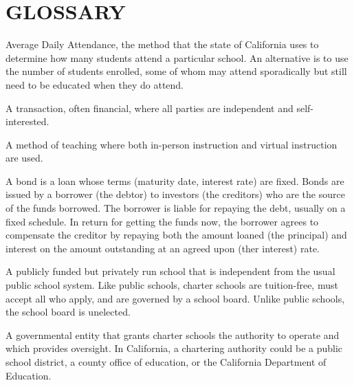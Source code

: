
\chapter[Glossary]{\centering\normalfont\normalzise GLOSSARY}\label{ch:glossary}

\begin{description}[nosep]\DoubleSpacing%

  \medskip\item[ADA] Average Daily Attendance, the method that the state of California uses to determine how many students attend a particular school. An alternative is to use the number of students enrolled, some of whom may attend sporadically but still need to be educated when they do attend. \parencite{SACS2019}

  \medskip\item[arm's length transaction] A transaction, often financial, where all parties are independent and self-interested. \parencite{Wex2024}

  \medskip\item[blended learning] A method of teaching where both in-person instruction and virtual instruction are used. \parencite{Graham2018}

  \medskip\item[bond] A bond is a loan whose terms (maturity date, interest rate) are fixed. Bonds are issued by a borrower (the debtor) to investors (the creditors) who are the source of the funds borrowed. The borrower is liable for repaying the debt, usually on a fixed schedule. In return for getting the funds now, the borrower agrees to compensate the creditor by repaying both the amount loaned (the principal) and interest on the amount outstanding at an agreed upon (ther interest) rate. \parencite{Borad2015}

  \medskip\item[charter school] A publicly funded but privately run school that is independent from the usual public school system. Like public schools, charter schools are tuition-free, must accept all who apply, and are governed by a school board. Unlike public schools, the school board is unelected. \parencite{CDE2023, CSBA2016, Eckes2024}

  \medskip\item[charter school authorizer] A governmental entity that grants charter schools the authority to operate and which provides oversight. In California, a chartering authority could be a public school district, a county office of education, or the California Department of Education. \parencite{NACSA2024}


\end{description}
